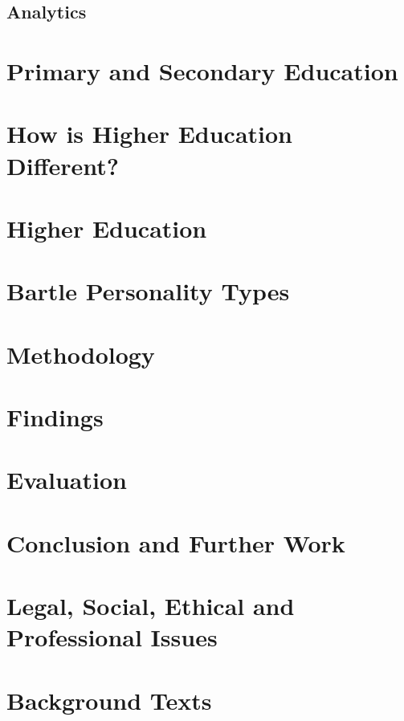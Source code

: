 \documentclass{article}
\begin{document}
\subsection{Analytics}

\section{Primary and Secondary Education}

\section{How is Higher Education Different?}

\section{Higher Education}

\section{Bartle Personality Types}

\section{Methodology}

\section{Findings}

\section{Evaluation}

\section{Conclusion and Further Work}

\section{Legal, Social, Ethical and Professional Issues}
\label{sec:issues}

\section{Background Texts}



\end{document}

